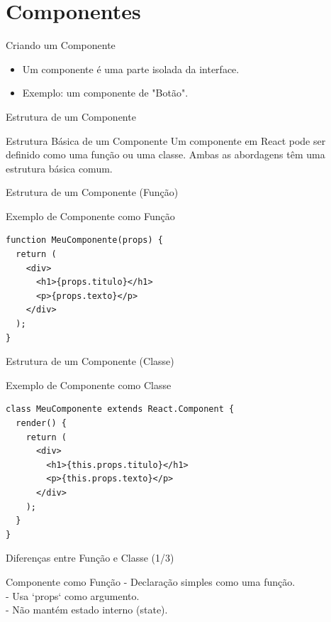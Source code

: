\documentclass[13pt, xcolor={dvipsnames,svgnames}, portuguese]{beamer}
\begin{document}
\section{Componentes}
\begin{frame}{Criando um Componente}
  \begin{itemize}
    \item Um componente é uma parte isolada da interface.
    \item Exemplo: um componente de "Botão".
  \end{itemize}
\end{frame}

\begin{frame}{Estrutura de um Componente}
  \begin{block}{Estrutura Básica de um Componente}
    Um componente em React pode ser definido como uma função ou uma classe. Ambas as abordagens têm uma estrutura básica comum.
  \end{block}
\end{frame}

\begin{frame}[fragile]{Estrutura de um Componente (Função)}
  \begin{exampleblock}{Exemplo de Componente como Função}
    \begin{verbatim}
function MeuComponente(props) {
  return (
    <div>
      <h1>{props.titulo}</h1>
      <p>{props.texto}</p>
    </div>
  );
}
    \end{verbatim}
  \end{exampleblock}
\end{frame}

\begin{frame}[fragile]{Estrutura de um Componente (Classe)}
  \begin{exampleblock}{Exemplo de Componente como Classe}
    \begin{verbatim}
class MeuComponente extends React.Component {
  render() {
    return (
      <div>
        <h1>{this.props.titulo}</h1>
        <p>{this.props.texto}</p>
      </div>
    );
  }
}
    \end{verbatim}
  \end{exampleblock}
\end{frame}

\begin{frame}{Diferenças entre Função e Classe (1/3)}
  \begin{block}{Componente como Função}
    - Declaração simples como uma função.\\
    - Usa `props` como argumento.\\
    - Não mantém estado interno (state).
  \end{block}
\end{frame}
\end{document}

